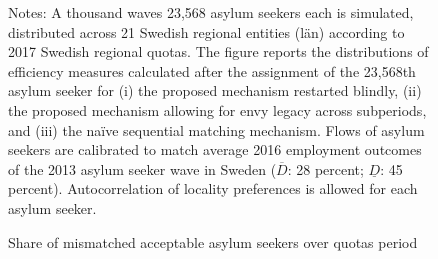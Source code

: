 \documentclass[12pt,fleqn]{article}
\begin{document}
\begin{figure}
	\caption{Share of mismatched acceptable asylum seekers over quotas period \label{FIG-quotas}}
	\begin{center}
	\end{center}
		{\scriptsize \vspace{-1em}
	\begin{singlespace}
		{\sc Notes:} A thousand waves 23,568 asylum seekers each is simulated, distributed across 21 Swedish regional entities (l\"{a}n) according to 2017 Swedish regional quotas. The figure reports the distributions of efficiency measures calculated after the assignment of the 23,568th asylum seeker for (i) the proposed mechanism restarted blindly, (ii) the proposed mechanism allowing for envy legacy across subperiods, and (iii) the na\"{i}ve sequential matching mechanism. Flows of asylum seekers are calibrated to match average 2016 employment outcomes of the 2013 asylum seeker wave in Sweden ($\overline{D}$: 28 percent; $\underline{D}$: 45 percent). Autocorrelation of locality preferences is allowed for each asylum seeker.
	\end{singlespace}
	 }
\end{figure}
\end{document}
